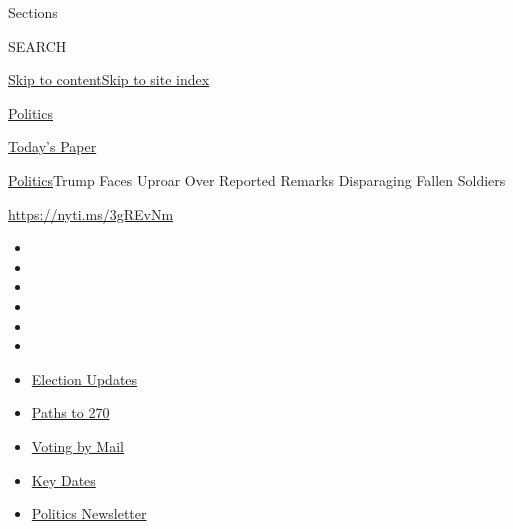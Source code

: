 Sections

SEARCH

\protect\hyperlink{site-content}{Skip to
content}\protect\hyperlink{site-index}{Skip to site index}

\href{https://www.nytimes3xbfgragh.onion/section/politics}{Politics}

\href{https://myaccount.nytimes3xbfgragh.onion/auth/login?response_type=cookie\&client_id=vi}{}

\href{https://www.nytimes3xbfgragh.onion/section/todayspaper}{Today's
Paper}

\href{/section/politics}{Politics}\textbar{}Trump Faces Uproar Over
Reported Remarks Disparaging Fallen Soldiers

\url{https://nyti.ms/3gREvNm}

\begin{itemize}
\item
\item
\item
\item
\item
\item
\end{itemize}

\begin{itemize}
\item
  \href{https://www.nytimes3xbfgragh.onion/live/2020/09/08/us/trump-vs-biden?action=click\&pgtype=Article\&state=default\&region=TOP_BANNER\&context=storylines_menu}{Election
  Updates}
\item
  \href{https://www.nytimes3xbfgragh.onion/interactive/2020/us/elections/election-states-biden-trump.html?action=click\&pgtype=Article\&state=default\&region=TOP_BANNER\&context=storylines_menu}{Paths
  to 270}
\item
  \href{https://www.nytimes3xbfgragh.onion/interactive/2020/08/31/us/politics/vote-by-mail-deadlines.html?action=click\&pgtype=Article\&state=default\&region=TOP_BANNER\&context=storylines_menu}{Voting
  by Mail}
\item
  \href{https://www.nytimes3xbfgragh.onion/interactive/2019/us/elections/2020-presidential-election-calendar.html?action=click\&pgtype=Article\&state=default\&region=TOP_BANNER\&context=storylines_menu}{Key
  Dates}
\item
  \href{https://www.nytimes3xbfgragh.onion/newsletters/politics?action=click\&pgtype=Article\&state=default\&region=TOP_BANNER\&context=storylines_menu}{Politics
  Newsletter}
\end{itemize}

